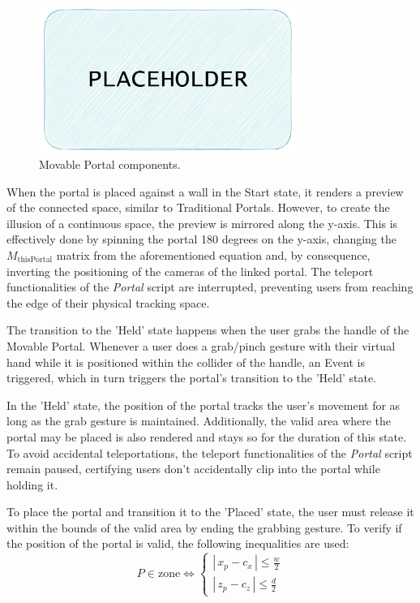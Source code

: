 \begin{figure}[t]
    \centering
     \includegraphics[width=0.75\textwidth]{NOVAthesisFiles/Images/placeholder.pdf}
     \caption[Movable Portal components.]
     {Movable Portal components.}
     \label{fig:mov-portal-comp}
\end{figure}

When the portal is placed against a wall in the Start state, it renders a preview of the connected space, similar to Traditional Portals. 
However, to create the illusion of a continuous space, the preview is mirrored along the y-axis. This is effectively done by 
spinning the portal 180 degrees on the y-axis, changing the $M_{\text{thisPortal}}$ matrix from the aforementioned equation and, 
by consequence, inverting the positioning of the cameras of the linked portal. The teleport functionalities of the \textit{Portal} script 
are interrupted, preventing users from reaching the edge of their physical tracking space.

The transition to the 'Held' state happens when the user grabs the handle of the Movable Portal. Whenever a user does a grab/pinch gesture 
with their virtual hand while it is positioned within the collider of the handle, an Event is triggered, which in
turn triggers the portal's transition to the 'Held' state. 

In the 'Held' state, the position of the portal tracks the user's movement for as long as the grab gesture is maintained. 
Additionally, the valid area where the portal may be placed is also rendered and stays so for the duration of this state.
To avoid accidental teleportations, the teleport functionalities of the \textit{Portal} script remain paused, 
certifying users don't accidentally clip into the portal while holding it.

To place the portal and transition it to the 'Placed' state, the user must release it within the bounds of the valid area by ending the 
grabbing gesture. To verify if the position of the portal is valid, the following inequalities are used:
\[
P \in \text{zone} \iff 
\begin{cases} 
|\,x_p - c_x\,| \le \frac{w}{2} \\[2mm]
|\,z_p - c_z\,| \le \frac{d}{2}
\end{cases}
\]

